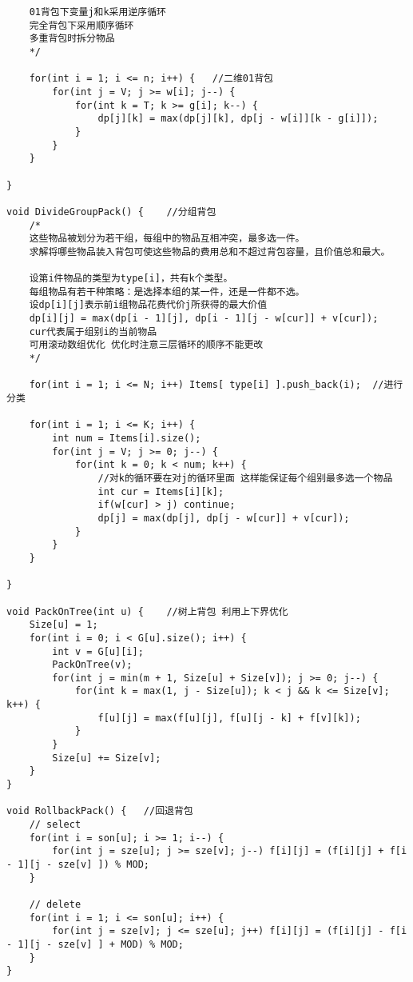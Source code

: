 \begin{lstlisting}
	01背包下变量j和k采用逆序循环
	完全背包下采用顺序循环
	多重背包时拆分物品
	*/
	
	for(int i = 1; i <= n; i++) {	//二维01背包 
		for(int j = V; j >= w[i]; j--) {
			for(int k = T; k >= g[i]; k--) {
				dp[j][k] = max(dp[j][k], dp[j - w[i]][k - g[i]]);
			}
		}
	}
	 
} 

void DivideGroupPack() {	//分组背包
	/*
	这些物品被划分为若干组，每组中的物品互相冲突，最多选一件。
	求解将哪些物品装入背包可使这些物品的费用总和不超过背包容量，且价值总和最大。
	
	设第i件物品的类型为type[i]，共有k个类型。
	每组物品有若干种策略：是选择本组的某一件，还是一件都不选。
	设dp[i][j]表示前i组物品花费代价j所获得的最大价值
	dp[i][j] = max(dp[i - 1][j], dp[i - 1][j - w[cur]] + v[cur]);
	cur代表属于组别i的当前物品
	可用滚动数组优化 优化时注意三层循环的顺序不能更改 
	*/ 
	
	for(int i = 1; i <= N; i++) Items[ type[i] ].push_back(i);	//进行分类 
	
	for(int i = 1; i <= K; i++) {
		int num = Items[i].size();
		for(int j = V; j >= 0; j--) {
			for(int k = 0; k < num; k++) {
				//对k的循环要在对j的循环里面 这样能保证每个组别最多选一个物品 
                int cur = Items[i][k];
				if(w[cur] > j) continue;
				dp[j] = max(dp[j], dp[j - w[cur]] + v[cur]);
			}
		}
	}
	
}

void PackOnTree(int u) {	//树上背包 利用上下界优化 
	Size[u] = 1;
	for(int i = 0; i < G[u].size(); i++) {
		int v = G[u][i];
		PackOnTree(v);
		for(int j = min(m + 1, Size[u] + Size[v]); j >= 0; j--) {
			for(int k = max(1, j - Size[u]); k < j && k <= Size[v]; k++) {
				f[u][j] = max(f[u][j], f[u][j - k] + f[v][k]);
			}
		}
		Size[u] += Size[v];
	}
}

void RollbackPack() {	//回退背包
	// select
	for(int i = son[u]; i >= 1; i--) {
		for(int j = sze[u]; j >= sze[v]; j--) f[i][j] = (f[i][j] + f[i - 1][j - sze[v] ]) % MOD;
	}
	
	// delete
	for(int i = 1; i <= son[u]; i++) {
		for(int j = sze[v]; j <= sze[u]; j++) f[i][j] = (f[i][j] - f[i - 1][j - sze[v] ] + MOD) % MOD;
	} 
}
\end{lstlisting}


